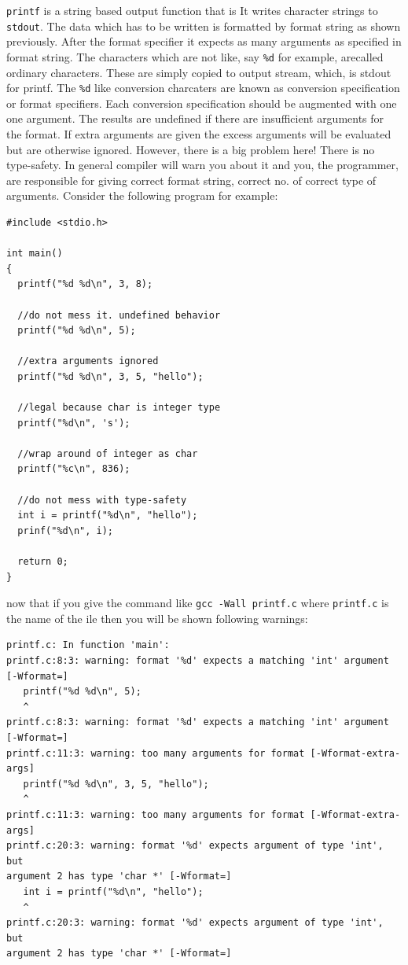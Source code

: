 \texttt{printf} is a string based output function that is It writes character
strings to \texttt{stdout}. The data which has to be written is formatted by
format string as shown previously. After the format specifier it expects as
many arguments as specified in format string. The characters which are not
like, say \texttt{\%d} for example, arecalled ordinary characters. These are
simply copied to output stream, which, is stdout for printf. The \texttt{\%d}
like conversion charcaters are known as conversion specification or format
specifiers. Each conversion specification should be augmented with one one
argument. The results are undefined if there are insufficient arguments for the
format. If extra arguments are given the excess arguments will be evaluated but
are otherwise ignored. However, there is a big problem here! There is no
type-safety. In general compiler will warn you about it and you, the
programmer, are responsible for giving correct format string, correct no. of
correct type of arguments. Consider the following program for example:

\begin{Verbatim}[frame=single]
#include <stdio.h>

int main()
{
  printf("%d %d\n", 3, 8);

  //do not mess it. undefined behavior
  printf("%d %d\n", 5);

  //extra arguments ignored
  printf("%d %d\n", 3, 5, "hello");

  //legal because char is integer type
  printf("%d\n", 's');

  //wrap around of integer as char
  printf("%c\n", 836);

  //do not mess with type-safety
  int i = printf("%d\n", "hello");
  prinf("%d\n", i);

  return 0;
}
\end{Verbatim}

now that if you give the command like \texttt{gcc -Wall printf.c} where
\texttt{printf.c} is the name of the ile then you will be shown following
warnings:

\begin{Verbatim}[frame=single]
printf.c: In function 'main':
printf.c:8:3: warning: format '%d' expects a matching 'int' argument [-Wformat=]
   printf("%d %d\n", 5);
   ^
printf.c:8:3: warning: format '%d' expects a matching 'int' argument [-Wformat=]
printf.c:11:3: warning: too many arguments for format [-Wformat-extra-args]
   printf("%d %d\n", 3, 5, "hello");
   ^
printf.c:11:3: warning: too many arguments for format [-Wformat-extra-args]
printf.c:20:3: warning: format '%d' expects argument of type 'int', but
argument 2 has type 'char *' [-Wformat=]
   int i = printf("%d\n", "hello");
   ^
printf.c:20:3: warning: format '%d' expects argument of type 'int', but
argument 2 has type 'char *' [-Wformat=]
\end{Verbatim}

